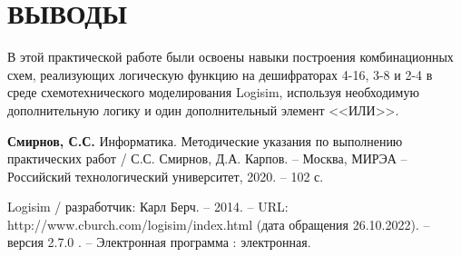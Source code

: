 \documentclass{mirea}
\begin{document}
\chapter{ВЫВОДЫ}
В этой практической работе были освоены навыки построения комбинационных схем, реализующих логическую функцию на дешифраторах 4-16, 3-8 и 2-4 в среде схемотехнического моделирования Logisim, используя необходимую дополнительную логику и один дополнительный элемент <<ИЛИ>>.

\begin{thebibliography}{99}
	 \textbf{Смирнов, С.С.} Информатика. Методические указания по выполнению практических работ / С.С. Смирнов, Д.А. Карпов. – Москва, МИРЭА – Российский технологический университет, 2020. – 102 с.
	
	 Logisim / разработчик: Карл Берч. – 2014. – URL: http://www.cburch.com/logisim/index.html (дата обращения 26.10.2022). – версия 2.7.0 . – Электронная программа : электронная.
\end{thebibliography}
\end{document}
